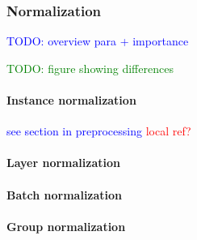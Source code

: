 \subsubsection{Normalization}

\textcolor{blue}{TODO: overview para + importance}

\textcolor{green}{TODO: figure showing differences}

\paragraph{Instance normalization}

\textcolor{blue}{see section in preprocessing \textcolor{red}{local ref?}}

\paragraph{Layer normalization}

\paragraph{Batch normalization}

\paragraph{Group normalization}